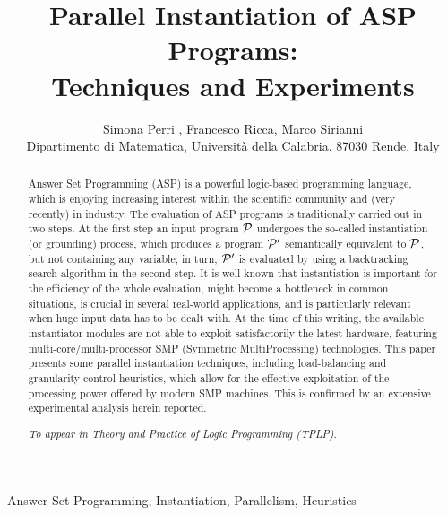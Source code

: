 \documentclass[preprint]{tlp}
\title[Theory and Practice of Logic Programming]{ Parallel Instantiation of ASP Programs: \\ Techniques and Experiments}
\author[Simona Perri, Francesco Ricca, Marco Sirianni]
{Simona Perri , Francesco Ricca,
Marco Sirianni\\
Dipartimento di Matematica, Universit{\`a} della Calabria, 87030 Rende, Italy\\
\email{\{perri,ricca,sirianni\}@mat.unical.it}}
\newcommand{\p}{\ensuremath{{\cal P}}\xspace}
\begin{document}
\maketitle

\begin{abstract}

Answer Set Programming (ASP) is a powerful logic-based programming
language, which is enjoying increasing interest within the
scientific community and (very recently) in industry.
The evaluation of ASP programs is traditionally carried out in two
steps. At the first step an input program $\p$ undergoes the
so-called instantiation (or grounding) process, which produces a
program $\p'$ semantically equivalent to $\p$, but not containing
any variable; in turn, $\p'$ is evaluated by using a backtracking
search algorithm in the second step.
It is well-known that instantiation is important for the efficiency
of the whole evaluation, might become a bottleneck in common
situations, is crucial in several real-world applications, and is
particularly relevant when huge input data has to be dealt with.
At the time of this writing, the available instantiator modules are
not able to exploit satisfactorily the latest hardware, featuring
multi-core/multi-processor SMP (Symmetric MultiProcessing)
technologies.
This paper presents some parallel instantiation techniques, including
load-balancing and granularity control heuristics, which allow for the effective exploitation of
the processing power offered by modern SMP machines.
This is confirmed by an extensive experimental analysis herein reported.


{\em To appear in Theory and Practice of Logic Programming (TPLP)}.
\end{abstract}

\begin{keywords}
Answer Set Programming, Instantiation, Parallelism, Heuristics
\end{keywords}
\end{document}
